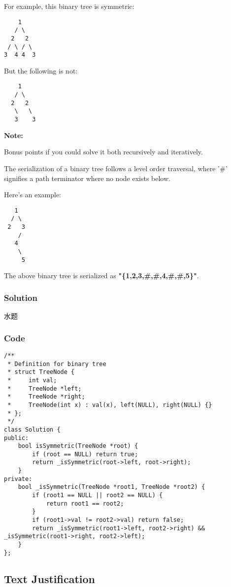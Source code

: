 \documentclass[courier]{article}
\begin{document}
\begin{CJK*}{UTF8}{gkai}
For example, this binary tree is symmetric:
\begin{verbatim}
    1
   / \
  2   2
 / \ / \
3  4 4  3
\end{verbatim}

But the following is not:


\begin{verbatim}
    1
   / \
  2   2
   \   \
   3    3
\end{verbatim}

\textbf{Note:}


Bonus points if you could solve it both recursively and iteratively.

The serialization of a binary tree follows a level order traversal, where '\#' signifies a path terminator where no node exists below.

Here's an example:


\begin{verbatim}
   1
  / \
 2   3
    /
   4
    \
     5
\end{verbatim}
The above binary tree is serialized as \textbf{"\{1,2,3,\#,\#,4,\#,\#,5\}"}.



\subsubsection*{Solution}
水题

\subsubsection*{Code}
\begin{lstlisting}
/**
 * Definition for binary tree
 * struct TreeNode {
 *     int val;
 *     TreeNode *left;
 *     TreeNode *right;
 *     TreeNode(int x) : val(x), left(NULL), right(NULL) {}
 * };
 */
class Solution {
public:
    bool isSymmetric(TreeNode *root) {
        if (root == NULL) return true;
        return _isSymmetric(root->left, root->right);
    }
private:
    bool _isSymmetric(TreeNode *root1, TreeNode *root2) {
        if (root1 == NULL || root2 == NULL) {
            return root1 == root2;
        }
        if (root1->val != root2->val) return false;
        return _isSymmetric(root1->left, root2->right) && _isSymmetric(root1->right, root2->left);
    }
}; 
\end{lstlisting}


\subsection{ Text Justification }


\end{CJK*}
\end{document}
